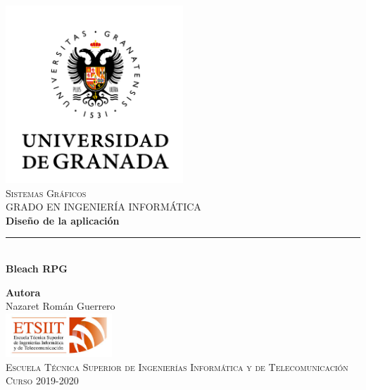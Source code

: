 \documentclass[11pt,a4paper]{article}
\begin{document}
\begin{titlepage}

\begin{minipage}{\textwidth}

\centering
\includegraphics[width=0.5\textwidth]{img/logo.png}\\

\textsc{\Large Sistemas Gráficos\\[0.2cm]}
\textsc{GRADO EN INGENIERÍA INFORMÁTICA}\\[1cm]

{\Huge\bfseries Diseño de la aplicación\\}
\noindent\rule[-1ex]{\textwidth}{3pt}\\[3.5ex]
{\large\bfseries Bleach RPG}
\end{minipage}

\vspace{1.5cm}
\begin{minipage}{\textwidth}
\centering

\textbf{Autora}\\ {Nazaret Román Guerrero}\\[2.5ex]
\includegraphics[width=0.3\textwidth]{img/etsiit.jpeg}\\[0.1cm]
\vspace{1cm}
\textsc{Escuela Técnica Superior de Ingenierías Informática y de Telecomunicación}\\
\vspace{1cm}
\textsc{Curso 2019-2020}
\end{minipage}
\end{titlepage}

\tableofcontents
\thispagestyle{empty}
\end{document}
